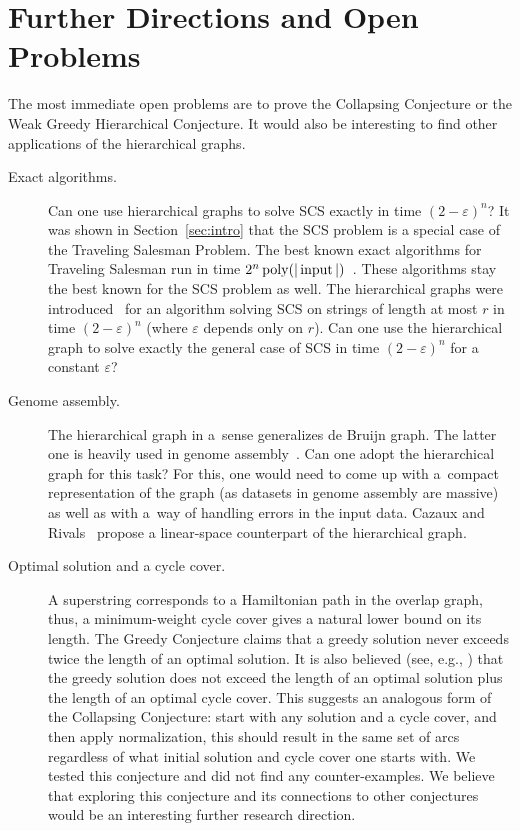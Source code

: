 \section{Further Directions and Open Problems}
The most immediate open problems are to prove the Collapsing Conjecture or the Weak Greedy Hierarchical Conjecture.
It would also be interesting to find other applications of the 
hierarchical graphs.
\begin{description}
\item[Exact algorithms.] Can one use hierarchical graphs to solve SCS exactly in time $(2-\varepsilon)^n$?
It was shown in Section~\ref{sec:intro} that the SCS problem is a special case of the Traveling Salesman Problem. The best known exact algorithms for Traveling Salesman run in time $2^n \operatorname{poly}(|\operatorname{input}|)$~\cite{B1962, HK1971, KGK1977, K1982, BF1996}. These algorithms stay the best known for the SCS problem as well. The hierarchical graphs were introduced~\cite{scs_exact} for an algorithm solving SCS on strings of length at most $r$ in time $(2-\varepsilon)^n$ (where $\varepsilon$ depends only on $r$). Can one use the hierarchical graph to solve exactly the general case of SCS in time $(2-\varepsilon)^n$ for a constant $\varepsilon$?

\item[Genome assembly.] The hierarchical graph in a~sense
generalizes de Bruijn graph. The latter one is heavily used
in genome assembly~\cite{pevzner2001eulerian}.
Can one adopt the hierarchical graph for this task? For this, one
would need to come up with a~compact representation of the graph
(as datasets in genome assembly are massive) as well as with a~way of
handling errors in the input data. Cazaux and Rivals~\cite{cazaux2018hierarchical} propose a linear-space counterpart of the hierarchical graph.

\item[Optimal solution and a cycle cover.] A superstring corresponds to a Hamiltonian path in the overlap graph, thus, a minimum-weight cycle cover gives a natural lower bound on its length. 
The Greedy Conjecture claims that a greedy solution never exceeds twice the length of an optimal solution. It is also  believed (see, e.g., \cite{weinard2006greedy,laube2005conditional}) that the greedy solution does not exceed the length of an optimal solution plus the length of an optimal cycle cover. This suggests an analogous form of the Collapsing Conjecture: start with any solution and a cycle cover, and then apply normalization, this should result in the same set of arcs regardless of what initial solution and cycle cover one starts with. We tested this conjecture and did not find any counter-examples. We believe that exploring this conjecture and its connections to other conjectures would be an interesting further research direction.
\end{description}
